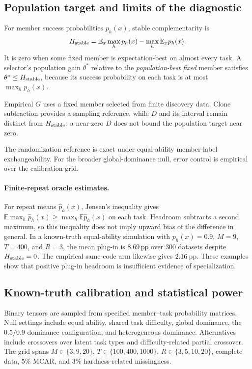 \subsection{Population target and limits of the diagnostic}
For member success probabilities $p_h(x)$, stable complementarity is
\[
H_{\rm stable}=\mathbb E_x\max_h p_h(x)-\max_h\mathbb E_x p_h(x).
\]
It is zero when some fixed member is expectation-best on almost every
task. A selector's population gain $\theta^*$ relative to the
\emph{population-best fixed} member satisfies
$\theta^*\le H_{\rm stable}$, because its success probability on each
task is at most $\max_h p_h(x)$.

Empirical $G$ uses a fixed member selected from finite discovery data.
Clone subtraction provides a sampling reference, while $D$ and its
interval remain distinct from $H_{\rm stable}$: a near-zero $D$ does
not bound the population target near zero.

The randomization reference is exact under equal-ability member-label
exchangeability. For the broader global-dominance null, error control
is empirical over the calibration grid.

\paragraph{Finite-repeat oracle estimates.}
For repeat means $\hat p_h(x)$, Jensen's inequality gives
$\mathbb E\max_h\hat p_h(x)\ge\max_h\mathbb E\hat p_h(x)$
on each task. Headroom subtracts a second maximum, so this inequality
does not imply upward bias of the difference in general. In a
known-truth equal-ability simulation with $p_h(x)=0.9$, $M=9$, $T=400$, and
$R=3$, the mean plug-in is $8.69$\,pp over $300$ datasets despite
$H_{\rm stable}=0$. The empirical same-code arm likewise gives
$2.16$\,pp. These examples show that positive plug-in
headroom is insufficient evidence of specialization.

\subsection{Known-truth calibration and statistical power}
Binary tensors are sampled from specified member--task probability
matrices. Null settings include equal ability, shared task difficulty,
global dominance, the $0.5/0.9$ dominance configuration, and heterogeneous
dominance. Alternatives
include crossovers over latent task types and difficulty-related
partial crossover. The grid spans $M\in\{3,9,20\}$,
$T\in\{100,400,1000\}$, $R\in\{3,5,10,20\}$, complete data,
5\% MCAR, and 3\% hardness-related missingness.

